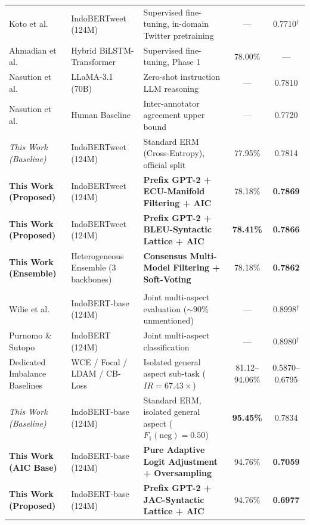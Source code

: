 \begin{tabularx}{\textwidth}{>{\raggedright\arraybackslash}p{3.6cm} >{\raggedright\arraybackslash}p{4.0cm} >{\raggedright\arraybackslash}X c c}
Koto et al. \cite{koto2020indolem} & IndoBERTweet (124M) & Supervised fine-tuning, in-domain Twitter pretraining & --- & 0.7710$^\dagger$ \\
Ahmadian et al. \cite{ahmadian2024hybrid} & Hybrid BiLSTM-Transformer & Supervised fine-tuning, Phase 1 & 78.00\% & --- \\
Nasution et al. \cite{nasution2025benchmarking} & LLaMA-3.1 (70B) & Zero-shot instruction LLM reasoning & --- & 0.7810 \\
Nasution et al. \cite{nasution2025benchmarking} & Human Baseline & Inter-annotator agreement upper bound & --- & 0.7720 \\
\midrule
\textit{This Work (Baseline)} & IndoBERTweet (124M) & Standard ERM (Cross-Entropy), official split & 77.95\% & 0.7814 \\
\textbf{This Work (Proposed)} & IndoBERTweet (124M) & \textbf{Prefix GPT-2 + ECU-Manifold Filtering + AIC} & 78.18\% & \textbf{0.7869} \\
\textbf{This Work (Proposed)} & IndoBERTweet (124M) & \textbf{Prefix GPT-2 + BLEU-Syntactic Lattice + AIC} & \textbf{78.41\%} & \textbf{0.7866} \\
\textbf{This Work (Ensemble)} & Heterogeneous Ensemble (3 backbones) & \textbf{Consensus Multi-Model Filtering + Soft-Voting} & 78.18\% & \textbf{0.7862} \\
\midrule
\multicolumn{5}{l}{\textbf{HoASA} --- \textit{Hotel Aspect Sentiment Analysis} ($K = 3$, $IR = 67.43\times$)} \\
\midrule
Wilie et al. \cite{wilie2020indonlu} & IndoBERT-base (124M) & Joint multi-aspect evaluation ($\sim$90\% unmentioned) & --- & 0.8998$^\dagger$ \\
Purnomo \& Sutopo \cite{purnomo2024comparison} & IndoBERT (124M) & Joint multi-aspect classification & --- & 0.8980$^\dagger$ \\
Dedicated Imbalance Baselines & WCE / Focal / LDAM / CB-Loss & Isolated general aspect sub-task ($IR=67.43\times$) & 81.12--94.06\% & 0.5870--0.6795 \\
\midrule
\textit{This Work (Baseline)} & IndoBERT-base (124M) & Standard ERM, isolated general aspect ($F_1(\text{neg})=0.50$) & \textbf{95.45\%} & 0.7834 \\
\textbf{This Work (AIC Base)} & IndoBERT-base (124M) & \textbf{Pure Adaptive Logit Adjustment + Oversampling} & 94.76\% & \textbf{0.7059} \\
\textbf{This Work (Proposed)} & IndoBERT-base (124M) & \textbf{Prefix GPT-2 + JAC-Syntactic Lattice + AIC} & 94.76\% & \textbf{0.6977} \\

\end{tabularx}
